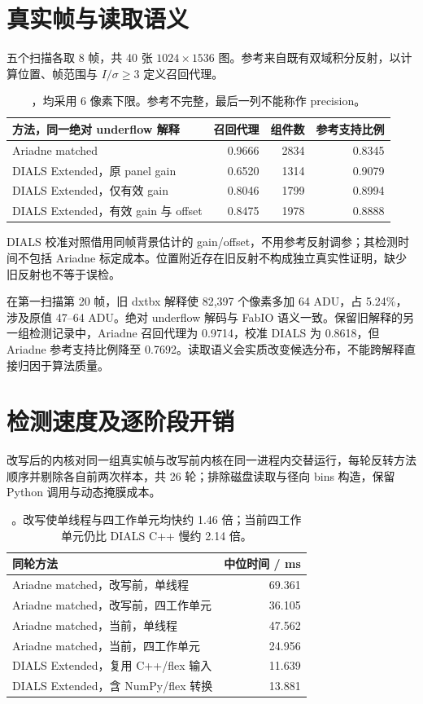 \section{真实帧与读取语义}
五个扫描各取 8 帧，共 40 张 $1024\times1536$ 图。参考来自既有双域积分反射，以计算位置、帧范围与 $I/\sigma\ge3$ 定义召回代理。
\begin{table}[htbp]\centering\small
\begin{tabularx}{\textwidth}{Xrrr}
\toprule 方法，同一绝对 underflow 解释 & 召回代理 & 组件数 & 参考支持比例\\\midrule
Ariadne matched & 0.9666 & 2834 & 0.8345\\
DIALS Extended，原 panel gain & 0.6520 & 1314 & 0.9079\\
DIALS Extended，仅有效 gain & 0.8046 & 1799 & 0.8994\\
DIALS Extended，有效 gain 与 offset & 0.8475 & 1978 & 0.8888\\
\bottomrule
\end{tabularx}
\caption{，均采用 6 像素下限。参考不完整，最后一列不能称作 precision。}
\end{table}
DIALS 校准对照借用同帧背景估计的 gain/offset，不用参考反射调参；其检测时间不包括 Ariadne 标定成本。位置附近存在旧反射不构成独立真实性证明，缺少旧反射也不等于误检。

在第一扫描第 20 帧，旧 dxtbx 解释使 82,397 个像素多加 64 ADU，占 5.24\%，涉及原值 47--64 ADU。绝对 underflow 解码与 FabIO 语义一致。保留旧解释的另一组检测记录中，Ariadne 召回代理为 0.9714，校准 DIALS 为 0.8618，但 Ariadne 参考支持比例降至 0.7692。读取语义会实质改变候选分布，不能跨解释直接归因于算法质量。
\section{检测速度及逐阶段开销}
改写后的内核对同一组真实帧与改写前内核在同一进程内交替运行，每轮反转方法顺序并剔除各自前两次样本，共 26 轮；排除磁盘读取与径向 bins 构造，保留 Python 调用与动态掩膜成本。

\begin{table}[htbp]\centering\small
\begin{tabular}{lr}
\toprule 同轮方法 & 中位时间 / ms\\\midrule
Ariadne matched，改写前，单线程 & 69.361\\
Ariadne matched，改写前，四工作单元 & 36.105\\
Ariadne matched，当前，单线程 & 47.562\\
Ariadne matched，当前，四工作单元 & 24.956\\
DIALS Extended，复用 C++/flex 输入 & 11.639\\
DIALS Extended，含 NumPy/flex 转换 & 13.881\\
\bottomrule
\end{tabular}
\caption{。改写使单线程与四工作单元均快约 1.46 倍；当前四工作单元仍比 DIALS C++ 慢约 2.14 倍。}
\end{table}

